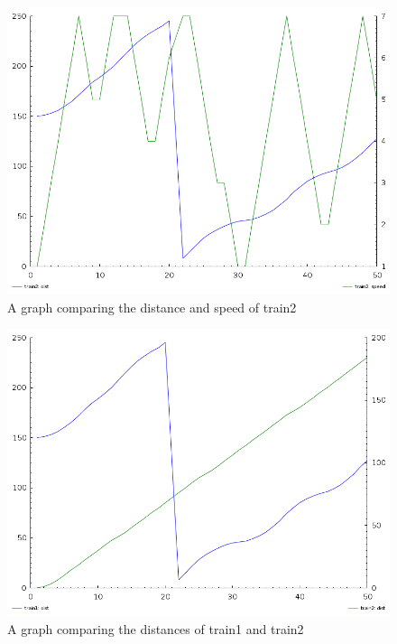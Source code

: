 \begin{figure}
\begin{center}
\includegraphics[scale=0.4]{t2graph.png}
\end{center}
\caption{A graph comparing the distance and speed of train2}
\end{figure}

\begin{figure}
\label{t1t2graph}
\begin{center}
\includegraphics[scale=0.4]{t1t2graph.png}
\end{center}
\caption{A graph comparing the distances of train1 and train2}
\end{figure}

